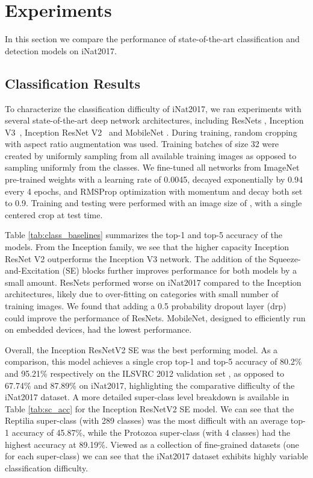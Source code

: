 \documentclass[10pt,twocolumn,letterpaper]{article}
\begin{document}
\section{Experiments}
In this section we compare the performance of state-of-the-art classification and detection models on iNat2017. 


\subsection{Classification Results}
To characterize the classification difficulty of iNat2017, we ran experiments with several state-of-the-art deep network architectures, including ResNets \cite{he2016deep}, Inception V3~\cite{szegedy2016rethinking}, Inception ResNet V2~\cite{szegedy2016inception} and MobileNet \cite{howard2017mobilenets}.
During training, random cropping with aspect ratio augmentation \cite{googlenet} was used. 
Training batches of size 32 were created by uniformly sampling from all available training images as opposed to sampling uniformly from the classes. 
We fine-tuned all networks from ImageNet pre-trained weights with a learning rate of 0.0045, decayed exponentially by 0.94 every 4 epochs, and RMSProp optimization with momentum and decay both set to 0.9.
Training and testing were performed with an image size of , with a single centered crop at test time.

Table \ref{tab:class_baselines} summarizes the top-1 and top-5 accuracy of the models. From the Inception family, we see that the higher capacity Inception ResNet V2 outperforms the Inception V3 network. The addition of the Squeeze-and-Excitation (SE) blocks \cite{hu2017squeeze} further improves performance for both models by a small amount.
ResNets performed worse on iNat2017 compared to the Inception architectures, likely due to over-fitting on categories with small number of training images.
We found that adding a 0.5 probability dropout layer (drp) could improve the performance of ResNets. 
MobileNet, designed to efficiently run on embedded devices, had the lowest performance.


Overall, the Inception ResNetV2 SE was the best performing model. As a comparison, this model achieves a single crop top-1 and top-5 accuracy of 80.2\% and 95.21\% respectively on the ILSVRC 2012 \cite{russakovsky2015imagenet} validation set \cite{szegedy2016inception}, as opposed to 67.74\% and 87.89\% on iNat2017, highlighting the comparative difficulty of the iNat2017 dataset. A more detailed super-class level breakdown is available in Table \ref{tab:sc_acc} for the Inception ResNetV2 SE model. We can see that the Reptilia super-class (with 289 classes) was the most difficult with an average top-1 accuracy of 45.87\%, while the Protozoa super-class (with 4 classes) had the highest accuracy at 89.19\%. Viewed as a collection of fine-grained datasets (one for each super-class) we can see that the iNat2017 dataset exhibits highly variable classification difficulty. 
\end{document}
